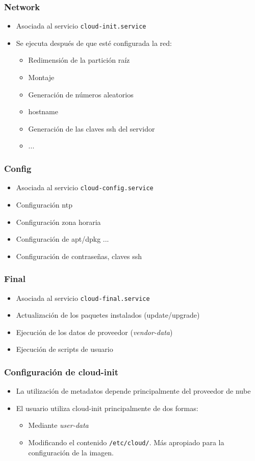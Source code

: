 \documentclass{beamer}
\begin{document}
\begin{frame}
  \frametitle{Network}
  \begin{itemize}
  \item Asociada al servicio \texttt{cloud-init.service}
  \item Se ejecuta después de que esté configurada la red:
    \begin{itemize}
    \item Redimensión de la partición raíz
    \item Montaje
    \item Generación de números aleatorios
    \item hostname
    \item Generación de las claves ssh del servidor
    \item ...
    \end{itemize}
  \end{itemize}
\end{frame}

\begin{frame}
  \frametitle{Config}
  \begin{itemize}
  \item Asociada al servicio \texttt{cloud-config.service}
  \item Configuración ntp
  \item Configuración zona horaria
  \item Configuración de apt/dpkg ...
  \item Configuración de contraseñas, claves ssh
  \end{itemize}
\end{frame}

\begin{frame}
  \frametitle{Final}
  \begin{itemize}
  \item Asociada al servicio \texttt{cloud-final.service}
  \item Actualización de los paquetes instalados (update/upgrade)
  \item Ejecución de los datos de proveedor (\textit{vendor-data})
  \item Ejecución de scripts de usuario
  \end{itemize}
\end{frame}

\begin{frame}
  \frametitle{Configuración de cloud-init}
  \begin{itemize}
  \item La utilización de metadatos depende principalmente del proveedor de nube
  \item El usuario utiliza cloud-init principalmente de dos formas:
    \begin{itemize}
    \item Mediante \textit{user-data}
    \item Modificando el contenido \texttt{/etc/cloud/}. Más apropiado
      para la configuración de la imagen.
    \end{itemize}
  \end{itemize}
\end{frame}
\end{document}
